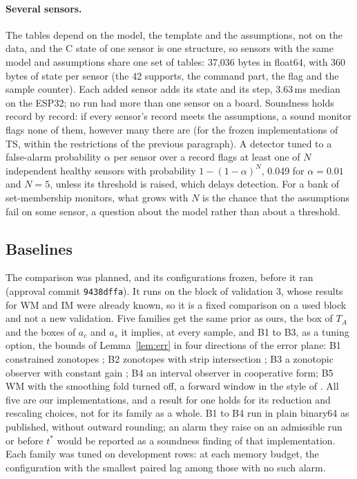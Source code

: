 \documentclass[11pt,a4paper]{article}
\newcommand{\tstar}{t^{\ast}}
\begin{document}
\paragraph{Several sensors.} The tables depend on the model, the template and the assumptions, not on the data, and
the C state of one sensor is one structure, so sensors with the same model and assumptions share one set of tables: 37,036 bytes in
float64, with 360 bytes of state per sensor (the 42 supports, the command part, the flag and the sample counter). Each
added sensor adds its state and its step, 3.63\,ms median on the ESP32; no run had more than one sensor on a board.
Soundness holds record by record: if every sensor's record meets the assumptions, a sound monitor flags none of them,
however many there are (for the frozen implementations of TS, within the restrictions of the previous paragraph). A
detector tuned to a false-alarm probability $\alpha$ per sensor over a record flags at least one of $N$ independent
healthy sensors with probability
$1-(1-\alpha)^N$, 0.049 for $\alpha = 0.01$ and $N = 5$, unless its threshold is raised, which delays detection. For a
bank of set-membership monitors, what grows with $N$ is the chance that the assumptions fail on some sensor, a question
about the model rather than about a threshold.

\subsection{Baselines}\label{sec:baselines}

The comparison was planned, and its configurations frozen, before it ran (approval commit \texttt{9438dffa}). It runs
on the block of validation 3, whose results for WM and IM were already known, so it is a fixed comparison on a used
block and not a new validation. Five families get the same prior as ours, the box of $T_A$ and the boxes of $a_c$ and
$a_s$ it implies, at every sample, and B1 to B3, as a tuning option, the bounds of Lemma~\ref{lem:err} in four
directions of the error plane: B1 constrained zonotopes \citep{scott2016}; B2 zonotopes with strip intersection
\citep{alamo2005}; B3 a zonotopic observer with constant gain \citep{combastel2015}; B4 an interval observer in
cooperative form; B5 WM with the smoothing fold turned off, a forward window in the style of \citet{kesavan2001}. All
five are our implementations, and a result for one holds for its reduction and rescaling choices, not for its family
as a whole. B1
to B4 run in plain binary64 as published, without outward rounding; an alarm they raise on an admissible run or
before $\tstar$ would be reported as a soundness finding of that implementation. Each family was tuned on development
rows: at each memory budget, the configuration with the smallest paired lag among those with no such alarm.
\end{document}
